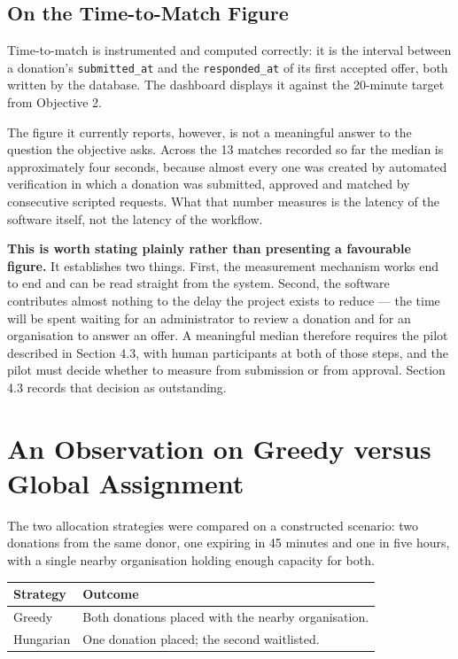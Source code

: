 \documentclass[12pt,a4paper]{report}
\begin{document}
\subsection{On the Time-to-Match Figure}

Time-to-match is instrumented and computed correctly: it is the interval between a donation's \texttt{submitted\_at} and the \texttt{responded\_at} of its first accepted offer, both written by the database. The dashboard displays it against the 20-minute target from Objective 2.

The figure it currently reports, however, is not a meaningful answer to the question the objective asks. Across the 13 matches recorded so far the median is approximately four seconds, because almost every one was created by automated verification in which a donation was submitted, approved and matched by consecutive scripted requests. What that number measures is the latency of the software itself, not the latency of the workflow.

\textbf{This is worth stating plainly rather than presenting a favourable figure.} It establishes two things. First, the measurement mechanism works end to end and can be read straight from the system. Second, the software contributes almost nothing to the delay the project exists to reduce --- the time will be spent waiting for an administrator to review a donation and for an organisation to answer an offer. A meaningful median therefore requires the pilot described in Section 4.3, with human participants at both of those steps, and the pilot must decide whether to measure from submission or from approval. Section 4.3 records that decision as outstanding.

\section{An Observation on Greedy versus Global Assignment}

The two allocation strategies were compared on a constructed scenario: two donations from the same donor, one expiring in 45 minutes and one in five hours, with a single nearby organisation holding enough capacity for both.

\begin{longtable}{@{}p{3.5cm}p{10cm}@{}}
\toprule
\textbf{Strategy} & \textbf{Outcome} \\
\midrule
\endhead
Greedy & Both donations placed with the nearby organisation. \\
Hungarian & One donation placed; the second waitlisted. \\
\bottomrule
\end{longtable}
\end{document}
